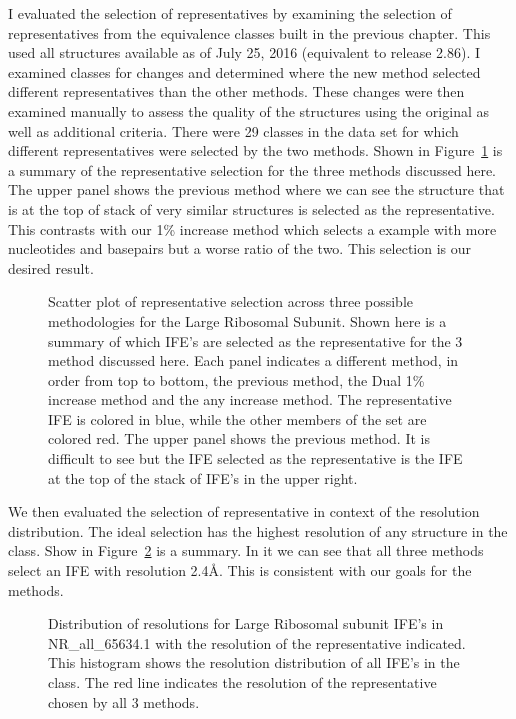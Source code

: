 I evaluated the selection of representatives by examining the selection of
representatives from the equivalence classes built in the previous chapter. This
used all structures available as of July 25, 2016 (equivalent to release 2.86).
I examined classes for changes and determined where the new method selected
different representatives than the other methods. These changes were then
examined manually to assess the quality of the structures using the original as
well as additional criteria. There were 29 classes in the data set for which
different representatives were selected by the two methods. Shown in
Figure~\ref{fig:hm-lsu-rep} is a summary of the representative selection for the
three methods discussed here. The upper panel shows the previous method where we
can see the structure that is at the top of stack of very similar structures is
selected as the representative. This contrasts with our 1\% increase method which
selects a example with more nucleotides and basepairs but a worse ratio of the
two. This selection is our desired result.

\begin{figure}
  \caption{Scatter plot of representative selection across three possible
    methodologies for the \HM{} Large Ribosomal Subunit. Shown here is a summary
    of which IFE’s are selected as the representative for the 3 method discussed
    here. Each panel indicates a different method, in order from top to bottom,
    the previous method, the Dual 1\% increase method and the any increase
    method. The representative IFE is colored in blue, while the other members
    of the set are colored red. The upper panel shows the previous method. It is
    difficult to see but the IFE selected as the representative is the IFE at
    the top of the stack of IFE’s
  in the upper right.}
  \label{fig:hm-lsu-rep}
\end{figure}

We then evaluated the selection of representative in context of the resolution
distribution. The ideal selection has the highest resolution of any structure in
the class. Show in Figure~\ref{fig:hm-rep-res-dist} is a summary. In it we can
see that all three methods select an IFE with resolution 2.4{\AA}. This is
consistent with our goals for the methods.

\begin{figure}
  \caption{Distribution of resolutions for \HM{} Large Ribosomal subunit IFE’s
    in NR\_all\_65634.1 with the resolution of the representative indicated.
    This histogram shows the resolution distribution of all IFE’s in the
    class. The red line indicates the resolution of the representative chosen by
  all 3 methods.}
  \label{fig:hm-rep-res-dist}
\end{figure}

